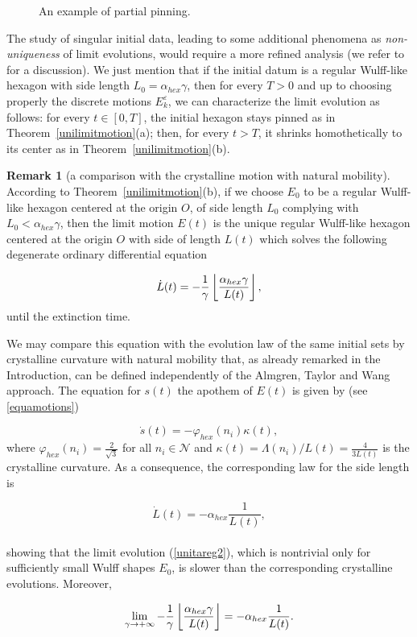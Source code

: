 \documentclass{interact}
\numberwithin{equation}{section}
\theoremstyle{definition}
\newtheorem{oss}[thm]{Remark}
\renewcommand{\epsilon}{\varepsilon}
\begin{document}
\begin{figure}[htbp]
\centering
\def\svgwidth{300pt}

\caption{An example of partial pinning.}
\label{longset}
\end{figure} 



The study of singular initial data, leading to some additional phenomena as \emph{non-uniqueness} of limit evolutions, would require a more refined analysis (we refer to \cite[Section~3.1.1]{BGN} for a discussion). We just mention that if the initial datum is a regular Wulff-like hexagon with side length $L_0=\alpha_{hex}\gamma$, then for every $T>0$ and up to choosing properly the discrete motions $E_k^\epsilon$, we can characterize the limit evolution as follows: for every $t\in[0,T]$, the initial hexagon stays pinned as in Theorem~\ref{unilimitmotion}(a); then, for every $t>T$, it shrinks homothetically to its center as in Theorem~\ref{unilimitmotion}(b).   


\begin{oss}[a comparison with the crystalline motion with natural mobility]
According to Theorem~\ref{unilimitmotion}(b), if we choose $E_0$ to be a regular Wulff-like hexagon centered at the origin $O$, of side length $L_0$ complying with $L_0<\alpha_{hex}\gamma$, then the limit motion $E(t)$ is the unique regular Wulff-like hexagon centered at the origin $O$ with side of length $L(t)$ which solves the following degenerate ordinary differential equation

\begin{equation}
\dot{L}(t)=-{1\over \gamma}\left\lfloor\frac{\alpha_{hex}\gamma}{L(t)}\right\rfloor,
\label{unitareg2}
\end{equation}
until the extinction time.

We may compare this equation with the evolution law of the same initial sets by crystalline curvature with natural mobility that, as already remarked in the Introduction, can be defined independently of the Almgren, Taylor and Wang approach. The equation for $s(t)$ the apothem of $E(t)$ is given by (see \eqref{equamotions})

\begin{equation*}
\dot{s}(t)=-\varphi_{hex}(n_i)\kappa(t),
\end{equation*}
where $\varphi_{hex}(n_i)=\frac{2}{\sqrt{3}}$ for all $n_i\in\mathcal{N}$ and $\kappa(t)=\Lambda(n_i)/L(t)=\frac{4}{3L(t)}$ is the crystalline curvature. As a consequence, the corresponding law for the side length is 

\begin{equation}
\dot{L}(t)=-\alpha_{hex}\frac{1}{L(t)},
\label{mobreg}
\end{equation}
\\
showing that the limit evolution (\ref{unitareg2}), which is nontrivial only for sufficiently small Wulff shapes $E_0$, is slower than 
the corresponding crystalline evolutions. Moreover,

\begin{equation*}
\lim_{\gamma\to+\infty}-{1\over \gamma}\left\lfloor\frac{\alpha_{hex}\gamma}{L(t)}\right\rfloor=-\alpha_{hex}\frac{1}{L(t)}.
\end{equation*}
\end{oss}
\end{document}
